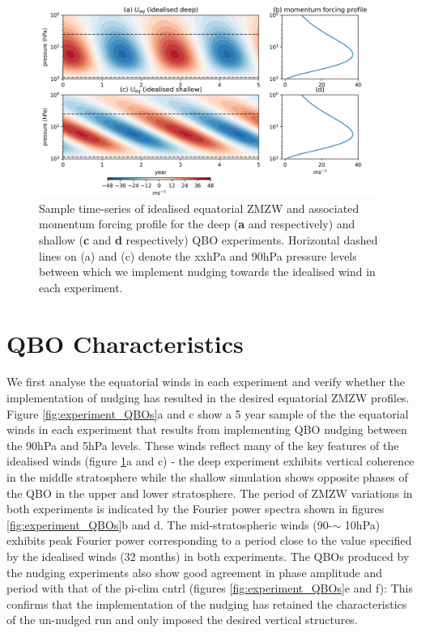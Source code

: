 \begin{figure}[h!]
\begin{center}
\noindent\includegraphics[width = \linewidth]{Figures/Figures-deepQBO/Idealised_QBO_features.png}
\caption[Idealised QBO winds used for nudging experiments]{Sample time-series of idealised equatorial ZMZW and associated momentum forcing profile for the deep (\textbf{a} and  respectively) and shallow (\textbf{c} and \textbf{d} respectively) QBO experiments. Horizontal dashed lines on (a) and (c) denote the xxhPa and 90hPa pressure levels between which we implement nudging towards the idealised wind in each experiment.}
\label{fig:Idealised_QBO_samples}
\end{center}
\end{figure}


\section{QBO Characteristics}
We first analyse the equatorial winds in each experiment and verify whether the implementation of nudging has resulted in the desired equatorial ZMZW profiles. Figure \ref{fig:experiment_QBOs}a and c show a 5 year sample of the the equatorial winds in each experiment that results from implementing QBO nudging between the 90hPa and 5hPa levels. These winds reflect many of the key features of the idealised winds (figure \ref{fig:Idealised_QBO_samples}a and c) - the deep experiment exhibits vertical coherence in the middle stratosphere while the shallow simulation shows opposite phases of the QBO in the upper and lower stratosphere. The period of ZMZW variations in both experiments is indicated by the Fourier power spectra shown in figures \ref{fig:experiment_QBOs}b and d. The mid-stratospheric winds (90-$\sim$ 10hPa) exhibits peak Fourier power corresponding to a period close to the value specified by the idealised winds (32 months) in both experiments. The QBOs produced by the nudging experiments also show good agreement in phase amplitude and period with that of the pi-clim cntrl (figures \ref{fig:experiment_QBOs}e and f): This confirms that the implementation of the nudging has retained the characteristics of the un-nudged run and only imposed the desired vertical structures.

